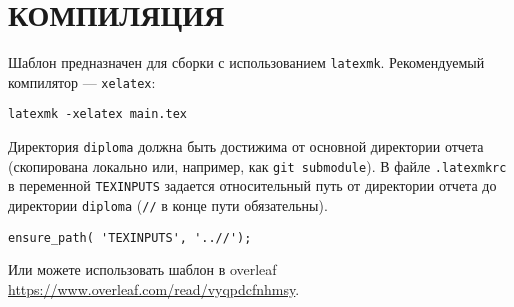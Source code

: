 \section{КОМПИЛЯЦИЯ}

Шаблон предназначен для сборки с использованием \texttt{latexmk}. Рекомендуемый компилятор --- \texttt{xelatex}:

\begin{verbatim}
latexmk -xelatex main.tex
\end{verbatim}

Директория \texttt{diploma} должна быть достижима от основной директории отчета (скопирована локально или, например, как \texttt{git submodule}). В файле \texttt{.latexmkrc} в переменной \texttt{TEXINPUTS} задается относительный путь от директории отчета до директории \texttt{diploma} (\texttt{//} в конце пути обязательны).

\begin{verbatim}
ensure_path( 'TEXINPUTS', '..//');
\end{verbatim}

Или можете использовать шаблон в overleaf \url{https://www.overleaf.com/read/vyqpdcfnhmsy}.
